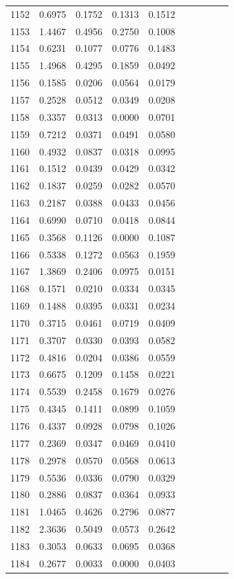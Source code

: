 \begin{table}
\begin{tabular}{cccccccccc}
1152& 0.6975& 0.1752& 0.1313& 0.1512\\ 
1153& 1.4467& 0.4956& 0.2750& 0.1008\\ 
1154& 0.6231& 0.1077& 0.0776& 0.1483\\ 
1155& 1.4968& 0.4295& 0.1859& 0.0492\\ 
1156& 0.1585& 0.0206& 0.0564& 0.0179\\ 
1157& 0.2528& 0.0512& 0.0349& 0.0208\\ 
1158& 0.3357& 0.0313& 0.0000& 0.0701\\ 
1159& 0.7212& 0.0371& 0.0491& 0.0580\\ 
1160& 0.4932& 0.0837& 0.0318& 0.0995\\ 
1161& 0.1512& 0.0439& 0.0429& 0.0342\\ 
1162& 0.1837& 0.0259& 0.0282& 0.0570\\ 
1163& 0.2187& 0.0388& 0.0433& 0.0456\\ 
1164& 0.6990& 0.0710& 0.0418& 0.0844\\ 
1165& 0.3568& 0.1126& 0.0000& 0.1087\\ 
1166& 0.5338& 0.1272& 0.0563& 0.1959\\ 
1167& 1.3869& 0.2406& 0.0975& 0.0151\\ 
1168& 0.1571& 0.0210& 0.0334& 0.0345\\ 
1169& 0.1488& 0.0395& 0.0331& 0.0234\\ 
1170& 0.3715& 0.0461& 0.0719& 0.0409\\ 
1171& 0.3707& 0.0330& 0.0393& 0.0582\\ 
1172& 0.4816& 0.0204& 0.0386& 0.0559\\ 
1173& 0.6675& 0.1209& 0.1458& 0.0221\\ 
1174& 0.5539& 0.2458& 0.1679& 0.0276\\ 
1175& 0.4345& 0.1411& 0.0899& 0.1059\\ 
1176& 0.4337& 0.0928& 0.0798& 0.1026\\ 
1177& 0.2369& 0.0347& 0.0469& 0.0410\\ 
1178& 0.2978& 0.0570& 0.0568& 0.0613\\ 
1179& 0.5536& 0.0336& 0.0790& 0.0329\\ 
1180& 0.2886& 0.0837& 0.0364& 0.0933\\ 
1181& 1.0465& 0.4626& 0.2796& 0.0877\\ 
1182& 2.3636& 0.5049& 0.0573& 0.2642\\ 
1183& 0.3053& 0.0633& 0.0695& 0.0368\\ 
1184& 0.2677& 0.0033& 0.0000& 0.0403\\ 

\end{tabular}
\end{table}
